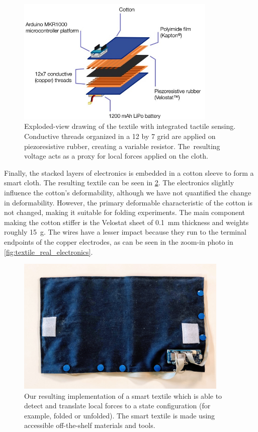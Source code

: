 \documentclass[\home/main.tex]{subfiles}
\begin{document}
\begin{figure}[htpb]
    \centering
    \includegraphics[width=0.85\textwidth, keepaspectratio]{figures/textile_overview.jpg}
    \caption{Exploded-view drawing of the textile with integrated tactile sensing. Conductive threads organized in a 12 by 7 grid are applied on piezoresistive rubber, creating a variable resistor. The~resulting voltage acts as a proxy for local forces applied on the cloth. }
    \label{fig:textile_scheme}
\end{figure}

Finally, the stacked layers of electronics is embedded in a cotton sleeve to form a smart cloth. The resulting textile can be seen in \cref{fig:textile_real}. The electronics slightly influence the cotton's deformability, although we have not quantified the change in deformability. However, the primary deformable characteristic of the cotton is not changed, making it suitable for folding experiments. The main component making the cotton stiffer is the Velostat sheet of \qty{0.1}{\milli\meter} thickness and weights roughly \qty{15}{\gram}. The wires have a lesser impact because they run to the terminal endpoints of the copper electrodes, as can be seen in the zoom-in photo in \cref{fig:textile_real_electronics}.

\begin{figure}[htpb]
    \centering
    \includegraphics[width=0.90\textwidth, keepaspectratio]{figures/textile.jpg}
    \caption{Our resulting implementation of a smart textile which is able to detect and translate local forces to a state configuration (for example, folded or unfolded). The smart textile is made using accessible off-the-shelf materials and tools.}
    \label{fig:textile_real}
\end{figure}
\end{document}
